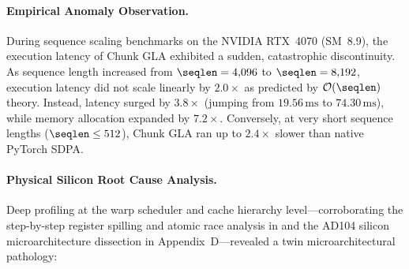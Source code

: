 \paragraph{Empirical Anomaly Observation.}
During sequence scaling benchmarks on the NVIDIA RTX~4070 (SM~8.9), the execution latency of Chunk GLA exhibited a sudden, catastrophic discontinuity.
As sequence length increased from $\seqlen = 4{,}096$ to $\seqlen = 8{,}192$, execution latency did not scale linearly by $2.0\times$ as predicted by $\mathcal{O}(\seqlen)$ theory.
Instead, latency surged by \textbf{$3.8\times$} (jumping from $19.56\,\text{ms}$ to $74.30\,\text{ms}$), while memory allocation expanded by $7.2\times$.
Conversely, at very short sequence lengths ($\seqlen \le 512$), Chunk GLA ran up to $2.4\times$ slower than native PyTorch SDPA.

\paragraph{Physical Silicon Root Cause Analysis.}
Deep profiling at the warp scheduler and cache hierarchy level—corroborating the step-by-step register spilling and atomic race analysis in  and the AD104 silicon microarchitecture dissection in Appendix~D—revealed a twin microarchitectural pathology:
